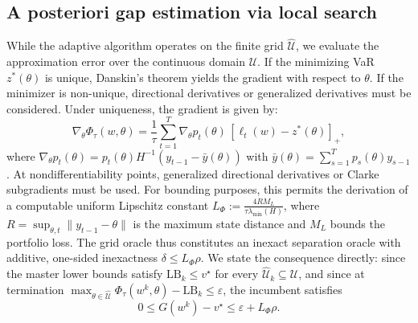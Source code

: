 \documentclass[smallextended]{svjour3}
\begin{document}
\subsection{A posteriori gap estimation via local search}\label{sec:certification}
While the adaptive algorithm operates on the finite grid $\widehat{\mathcal{U}}$, we evaluate the approximation error over the continuous domain $\mathcal{U}$. If the minimizing VaR $z^*(\theta)$ is unique, Danskin's theorem yields the gradient with respect to $\theta$. If the minimizer is non-unique, directional derivatives or generalized derivatives must be considered. Under uniqueness, the gradient is given by:
\begin{equation}
\nabla_\theta \Phi_\tau(w,\theta) = \frac{1}{\tau}\sum_{t=1}^T \nabla_\theta p_t(\theta)\,[\ell_t(w) - z^*(\theta)]_+ ,
\end{equation}
where $\nabla_\theta p_t(\theta) = p_t(\theta) H^{-1}(y_{t-1} - \bar{y}(\theta))$ with $\bar{y}(\theta) = \sum_{s=1}^T p_s(\theta) y_{s-1}$. At nondifferentiability points, generalized directional derivatives or Clarke subgradients must be used. For bounding purposes, this permits the derivation of a computable uniform Lipschitz constant $L_\Phi := \frac{4 R M_L}{\tau \lambda_{\min}(H)}$, where $R = \sup_{\theta, t}\|y_{t-1} - \theta\|$ is the maximum state distance and $M_L$ bounds the portfolio loss. 
The grid oracle thus constitutes an inexact separation oracle with additive, one-sided inexactness $\delta \le L_\Phi \rho$. We state the consequence directly: since the master lower bounds satisfy $\mathrm{LB}_k \le v^\star$ for every $\widehat{\mathcal{U}}_k \subseteq \mathcal{U}$, and since at termination $\max_{\theta \in \widehat{\mathcal{U}}} \Phi_\tau(w^k,\theta) - \mathrm{LB}_k \le \varepsilon$, the incumbent satisfies
\begin{equation}
0 \le G(w^k) - v^\star \le \varepsilon + L_\Phi \rho .
\end{equation}
\end{document}
